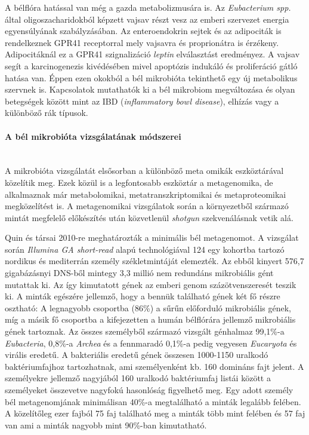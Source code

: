 \documentclass[a4paper,12pt]{article}
\begin{document}
		A bélflóra hatással van még a gazda metabolizmusára is.  Az \textit{Eubacterium spp.} által oligoszacharidokból képzett vajsav részt vesz az emberi szervezet energia egyensúlyának szabályzásában. \cite{gut_microbiome} Az enteroendokrin sejtek és az adipociták is rendelkeznek GPR41 receptorral mely vajsavra és proprionátra is érzékeny. Adipocitáknál ez a GPR41 szignalizáció \textit{leptin} elválasztást eredményez. \cite{buthyrate_immune} A vajsav segít a karcinogenezis kivédésében mivel apoptózis indukáló és proliferáció gátló hatása van. Éppen ezen okokból a bél mikrobióta tekinthető egy új metabolikus szervnek is. \cite{host_bacterial_mutualism} Kapcsolatok mutathatók ki a bél mikrobiom megváltozása és olyan betegségek között mint az IBD (\textit{inflammatory bowl disease}), elhízás vagy a különböző rák típusok. \cite{gut_microbiome}
		
		\paragraph{A bél mikrobióta vizsgálatának módszerei} \mbox{}\\
		A mikrobióta vizsgálatát elsősorban a különböző meta omikák eszköztárával közelítik meg. Ezek közül is a legfontosabb eszköztár a metagenomika, de alkalmaznak már metabolomikai, metatranszkriptomikai és metaproteomikai megközelítést is. A metagenomikai vizsgálatok során a környezetből származó mintát megfelelő előkészítés után közvetlenül \textit{shotgun} szekvenálásnak vetik alá.\cite{gut_microbiome} 
		
		Quin és társai 2010-re meghatározták a minimális bél metagenomot. A vizsgálat során \textit{Illumina GA short-read} alapú technológiával 124 egy kohortba tartozó nordikus és mediterrán személy székletmintáját elemezték. Az ebből kinyert 576,7 gigabázásnyi DNS-ből mintegy 3,3 millió nem redundáns mikrobiális gént mutattak ki. Az így kimutatott gének az emberi genom százötvenszeresét teszik ki. A minták egészére jellemző, hogy a bennük található gének két fő részre osztható: A legnagyobb csoportba (86\%) a sűrűn előforduló mikrobiális gének, míg a másik fő csoportba a kifejezetten a humán bélflórára jellemző mikrobiális gének tartoznak. Az összes személyből származó vizsgált génhalmaz 99,1\%-a \textit{Eubacteria}, 0,8\%-a \textit{Archea} és a fennmaradó 0,1\%-a pedig vegyesen \textit{Eucaryota} és virális eredetű. A bakteriális eredetű gének összesen 1000-1150 uralkodó baktériumfajhoz tartozhatnak, ami személyenként kb. 160 domináns fajt jelent. A személyekre jellemző nagyjából 160 uralkodó baktériumfaj listái között a személyeket összevetve nagyfokú hasonlóság figyelhető meg. Egy adott személy bél metagenomjának minimálisan 40\%-a megtalálható a minták legalább felében. A közelítőleg ezer fajból 75 faj található meg a minták több mint felében és 57 faj van ami a minták nagyobb mint 90\%-ban kimutatható.  \cite{meta_omics}
		
\end{document}

